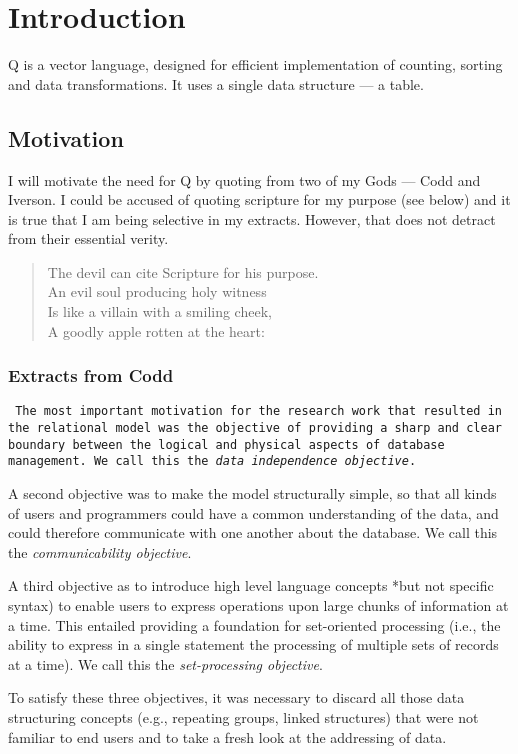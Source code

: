 
\newcommand{\YES}{\checkmark}


\section{Introduction}

Q is a vector language, designed for efficient implementation
of counting, sorting and data transformations. It uses a single data
structure --- a table.

\subsection{Motivation}

I will motivate the need for Q by quoting from two of my Gods --- Codd and
Iverson. I could be accused of quoting scripture for my purpose (see
below) and it is true that I am being selective in my extracts.
However, that does not detract from their essential verity.

\begin{verse}
The devil can cite Scripture for his purpose. \\ 
An evil soul producing holy witness \\ 
Is like a villain with a smiling cheek, \\
A goodly apple rotten at the heart:
\end{verse}

\subsubsection{Extracts from Codd}

{\tt 
The most important motivation for the research work that resulted in the
relational model was the objective of providing a sharp and clear
boundary between the logical and physical aspects of database
management. We call this the {\em data independence objective}.

A second objective was to make the model structurally simple, so that
all kinds of users and programmers could have a common understanding of
the data, and could therefore communicate with one another about the
database. We call this the {\em communicability objective}.

A third objective as to introduce high level language concepts *but not
specific syntax) to enable users to express operations upon large chunks
of information at a time. This entailed providing a foundation for
set-oriented processing (i.e., the ability to express in a single
statement the processing of multiple sets of records at a time). We
call this the {\em set-processing objective}.

To satisfy these three objectives, it was necessary to discard all those
data structuring concepts (e.g., repeating groups, linked structures)
that were not familiar to end users and to take a fresh look at
the addressing of data.
}

